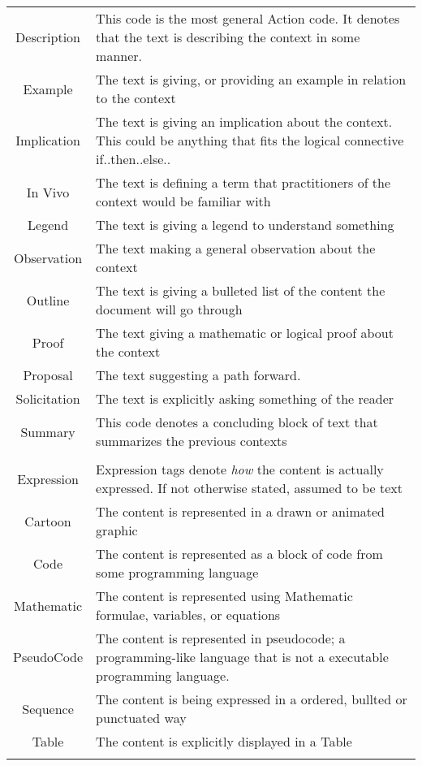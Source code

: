 \begin{table}[h!]
\begin{tabular}{c p{1.8\linewidth}}
    Description & This code is the most general Action code. It denotes that the text is describing the context in some manner.\\
    Example & The text is giving, or providing an example in relation to the context\\
    Implication & The text is giving an implication about the context. This could be anything that fits the logical connective if..then..else..\\
    In Vivo & The text is defining a term that practitioners of the context would be familiar with\\
    Legend & The text is giving a legend to understand something\\
    Observation & The text making a general observation about the context\\
    Outline & The text is giving a bulleted list of the content the document will go through\\
    Proof & The text giving a mathematic or logical proof about the context\\
    Proposal & The text suggesting a path forward.\\
    Solicitation & The text is explicitly asking something of the reader\\
    Summary & This code denotes a concluding block of text that summarizes the previous contexts\\

\\
    Expression & Expression tags denote \emph{how }the content is actually expressed. If not otherwise stated, assumed to be text \\
    \hline
    Cartoon & The content is represented in a drawn or animated graphic\\
    Code & The content is represented as a block of code from some programming language\\
    Mathematic & The content is represented using Mathematic formulae, variables, or equations\\
    PseudoCode & The content is represented in pseudocode; a programming-like language that is not a executable programming language.\\
    Sequence & The content is being expressed in a ordered, bullted or punctuated way\\
    Table & The content is explicitly displayed in a Table\\
    \\


\end{tabular}
\end{table}

